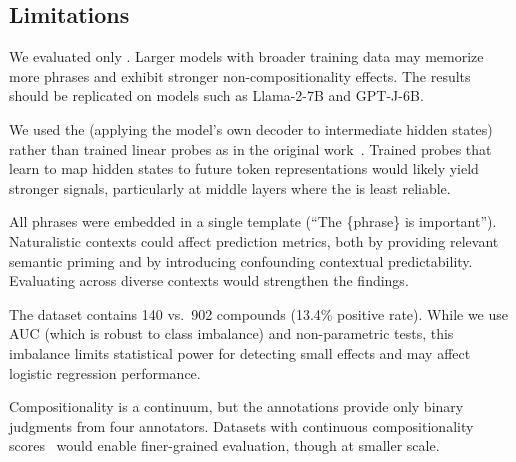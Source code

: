\subsection{Limitations}
\label{sec:limitations}

We evaluated only \gptxl.
Larger models with broader training data may memorize more phrases and exhibit stronger non-compositionality effects.
The results should be replicated on models such as Llama-2-7B and GPT-J-6B.

We used the \logitlens (applying the model's own decoder to intermediate hidden states) rather than trained linear probes as in the original \futurelens work~\citep{pal2023future}.
Trained probes that learn to map hidden states to future token representations would likely yield stronger signals, particularly at middle layers where the \logitlens is least reliable.

All phrases were embedded in a single template (``The \{phrase\} is important'').
Naturalistic contexts could affect prediction metrics, both by providing relevant semantic priming and by introducing confounding contextual predictability.
Evaluating across diverse contexts would strengthen the findings.

The \farahmand dataset contains 140 \noncomp vs.\ 902 \comp compounds (13.4\% positive rate).
While we use AUC (which is robust to class imbalance) and non-parametric tests, this imbalance limits statistical power for detecting small effects and may affect logistic regression performance.

Compositionality is a continuum, but the \farahmand annotations provide only binary judgments from four annotators.
Datasets with continuous compositionality scores~\citep{reddy2011empirical} would enable finer-grained evaluation, though at smaller scale.
